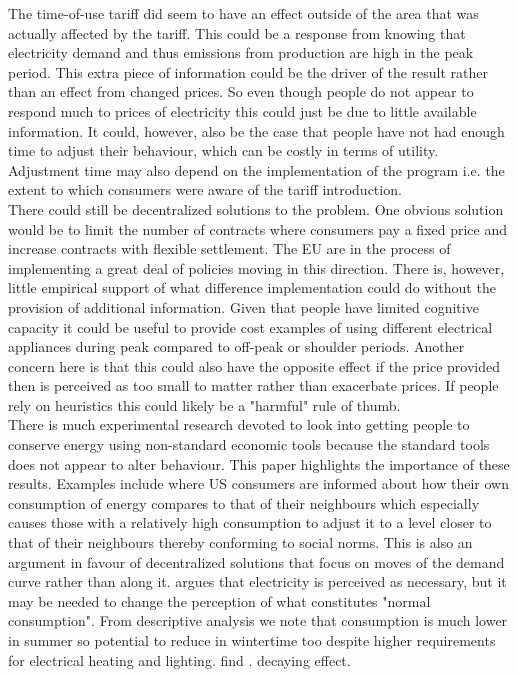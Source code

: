 The time-of-use tariff did seem to have an effect outside of the area that was actually affected by the tariff. This could be a response from knowing that electricity demand and thus emissions from production are high in the peak period. This extra piece of information could be the driver of the result rather than an effect from changed prices. So even though people do not appear to respond much to prices of electricity this could just be due to little available information. It could, however, also be the case that people have not had enough time to adjust their behaviour, which can be costly in terms of utility. Adjustment time may also depend on the implementation of the program i.e. the extent to which consumers were aware of the tariff introduction.
\smallskip \\

There could still be decentralized solutions to the problem. One obvious solution would be to limit the number of contracts where consumers pay a fixed price and increase contracts with flexible settlement. The EU are in the process of implementing a great deal of policies moving in this direction. There is, however, little empirical support of what difference implementation could do without the provision of additional information. Given that people have limited cognitive capacity it could be useful to provide cost examples of using different electrical appliances during peak compared to off-peak or shoulder periods.
Another concern here is that this could also have the opposite effect if the price provided then is perceived as too small to matter rather than exacerbate prices. If people rely on heuristics this could likely be a "harmful" rule of thumb.
\smallskip \\

There is much experimental research devoted to look into getting people to conserve energy using non-standard economic tools because the standard tools does not appear to alter behaviour. This paper highlights the importance of these results. Examples include \cite{allcott2011social} where US consumers are informed about how their own consumption of energy compares to that of their neighbours which especially causes those with a relatively high consumption to adjust it to a level closer to that of their neighbours thereby conforming to social norms. This is also an argument in favour of decentralized solutions that focus on moves of the demand curve rather than along it. \cite{kirschen2003demand} argues that electricity is perceived as necessary, but it may be needed to change the perception of what constitutes "normal consumption". From descriptive analysis we note that consumption is much lower in summer so potential to reduce in wintertime too despite higher requirements for electrical heating and lighting.
\cite{allcott2014short} find . decaying effect.


